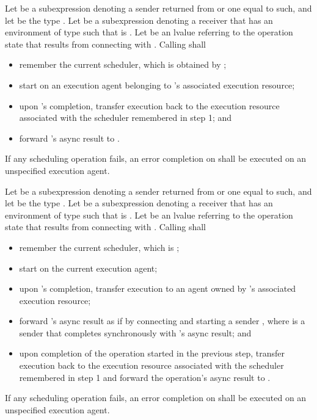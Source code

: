 \pnum
Let  be a subexpression denoting
a sender returned from  or one equal to such, and
let  be the type .
Let  be a subexpression denoting a receiver
that has an environment of type 
such that  is .
Let  be an lvalue referring to the operation state
that results from connecting  with .
Calling  shall
\begin{itemize}
\item
remember the current scheduler,
which is obtained by ;
\item
start  on an execution agent belonging to
's associated execution resource;
\item
upon 's completion,
transfer execution back to the execution resource
associated with the scheduler remembered in step 1; and
\item
forward 's async result to .
\end{itemize}
If any scheduling operation fails,
an error completion on  shall be executed
on an unspecified execution agent.

\pnum
Let  be a subexpression denoting
a sender returned from  or one equal to such, and
let  be the type .
Let  be a subexpression denoting a receiver
that has an environment of type 
such that  is .
Let  be an lvalue referring to the operation state
that results from connecting  with .
Calling  shall
\begin{itemize}
\item
remember the current scheduler,
which is
;
\item
start  on the current execution agent;
\item
upon 's completion,
transfer execution to an agent
owned by 's associated execution resource;
\item
forward 's async result as if by
connecting and starting a sender ,
where  is a sender
that completes synchronously with 's async result; and
\item
upon completion of the operation started in the previous step,
transfer execution back to the execution resource
associated with the scheduler remembered in step 1 and
forward the operation's async result to .
\end{itemize}
If any scheduling operation fails,
an error completion on  shall be executed on
an unspecified execution agent.


